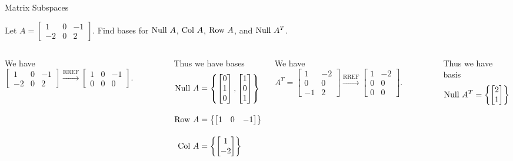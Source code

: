 \documentclass[xcolor=dvipsnames,aspectratio=169,t]{beamer}
\begin{document}
\begin{frame}{Matrix Subspaces}
  \medskip

  Let $A = \begin{bmatrix} 1 & 0 & -1 \\ -2 & 0 & 2 \end{bmatrix}$. 
  Find bases for $\mbox{Null } A$, $\mbox{Col } A$, $\mbox{Row } A$, and $\mbox{Null } A^T$.
  \bigskip

  \pause
  \begin{columns}[T]

  \column{0.5\tw}

  We have $\begin{bmatrix} 1 & 0 & -1  \\ -2 & 0 & 2  \end{bmatrix} \xrightarrow{\text{RREF}} \begin{bmatrix} 1 & 0 & -1  \\ 0 & 0 & 0  \end{bmatrix}$.
  \medskip
  
  Thus we have bases
  \begin{align*}
  \mbox{Null } A &= \left\{ \begin{bmatrix} 0 \\ 1 \\ 0 \end{bmatrix}, 
                    \begin{bmatrix} 1 \\ 0 \\ 1 \end{bmatrix} \right\} \\[1em]
  \mbox{Row } A &= \left\{ \begin{bmatrix} 1 & 0 & -1 \end{bmatrix}  \right\} \\[1em]
  \mbox{Col } A &= \left\{ \begin{bmatrix} 1 \\ -2  \end{bmatrix}  \right\}
  \end{align*}

  \column{0.50\tw}
  \pause
  We have $A^T=\begin{bmatrix} 1 & -2 \\ 0 & 0 \\ -1 & 2 \end{bmatrix} \xrightarrow{\text{RREF}} \begin{bmatrix} 1 & -2 \\ 0 & 0 \\ 0 & 0 \end{bmatrix}$.
  \medskip
  
  Thus we have basis
  \[\mbox{Null } A^T = \left\{ \begin{bmatrix} 2 \\ 1  \end{bmatrix} \right\} \]
  \end{columns}
\end{frame}
\end{document}

